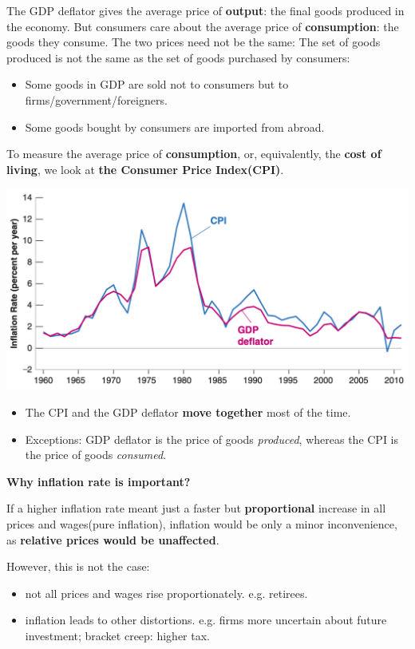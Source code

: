 \documentclass[11pt, a4paper]{ECON2123}
\begin{document}
\begin{spacing}{1.5}
    The GDP deflator gives the average price of {\bf output}: the final 
    goods produced in the economy. But consumers care about the average 
    price of {\bf consumption}: the goods they consume. 
    The two prices need not be the same: The set of goods produced 
    is not the same as the set of goods purchased by consumers:
    \begin{itemize}
        \item Some goods in GDP are sold not to consumers but to 
        firms/government/foreigners.
        \item Some goods bought by consumers are imported from abroad.
    \end{itemize}

    To measure the average price of {\bf consumption}, or, equivalently, 
    the {\bf cost of living}, we look at {\bf the Consumer Price Index(CPI)}.
    \begin{center}
        \includegraphics[scale=0.36]{images/0102-cpi-vs-deflator.png}
    \end{center}
    \begin{itemize}
        \item The CPI and the GDP deflator {\bf move together} most of the time.
        \item Exceptions: GDP deflator is the price of goods {\it produced}, 
        whereas the CPI is the price of goods {\it consumed}.
    \end{itemize}

    {\bf Why inflation rate is important?}

    If a higher inflation rate meant just a faster but {\bf proportional} 
    increase in all prices and wages(pure inflation), inflation would be 
    only a minor inconvenience, as {\bf relative prices would be unaffected}.

    However, this is not the case:
    \begin{itemize}
        \item not all prices and wages rise proportionately. e.g. retirees.
        \item inflation leads to other distortions. e.g. firms more uncertain 
        about future investment; bracket creep: higher tax.
    \end{itemize}


\end{spacing}
\end{document}
